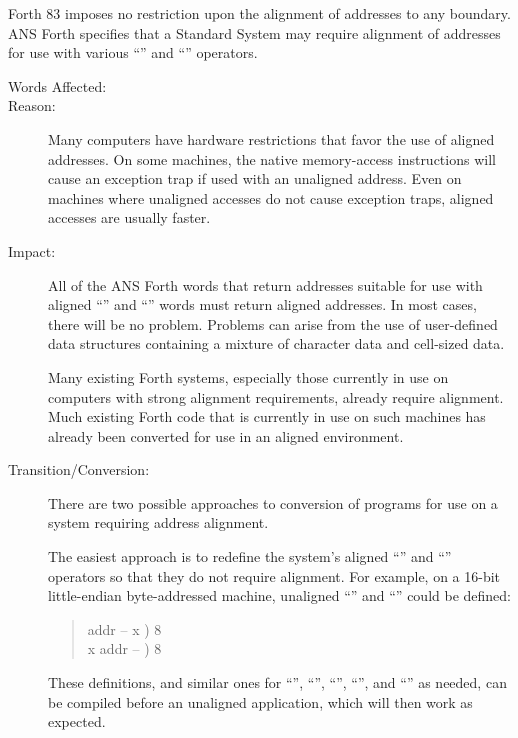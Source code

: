 Forth 83 imposes no restriction upon the alignment of addresses to
any boundary. ANS Forth specifies that a Standard System may require
alignment of addresses for use with various ``'' and
``\word{!}'' operators.

\begin{description}
\item[Words Affected:]
	\word{!}	\word{+!}			
			\word{,}

\item[Reason:]
	Many computers have hardware restrictions that favor the use of
	aligned addresses. On some machines, the native memory-access
	instructions will cause an exception trap if used with an
	unaligned address. Even on machines where unaligned accesses do
	not cause exception traps, aligned accesses are usually faster.

\item[Impact:]
	All of the ANS Forth words that return addresses suitable for
	use with aligned ``'' and ``\word{!}'' words must return
	aligned addresses. In most cases, there will be no problem.
	Problems can arise from the use of user-defined data structures
	containing a mixture of character data and cell-sized data.

	Many existing Forth systems, especially those currently in use on
	computers with strong alignment requirements, already require
	alignment. Much existing Forth code that is currently in use on
	such machines has already been converted for use in an aligned
	environment.

\item[Transition/Conversion:]
	There are two possible approaches to conversion of programs for
	use on a system requiring address alignment.

	The easiest approach is to redefine the system's aligned
	``'' and ``\word{!}'' operators so that they do not
	require alignment. For example, on a 16-bit little-endian
	byte-addressed machine, unaligned ``'' and ``\word{!}''
	could be defined:
	\begin{quote}\ttfamily
		\word{:}   addr -- x )
			  
			  8
			 
		\word{;} \\
		\word{:} \word{!}  x addr -- )
			 8 
			 
			\word{C!} 
		\word{;}
	\end{quote}
	These definitions, and similar ones for ``\word{+!}'',
	``'', ``'', ``\word{,}'', and 
	``'' as needed, can be compiled before an
	unaligned application, which will then work as expected.


\end{description}
